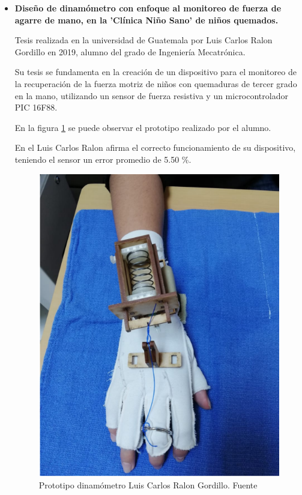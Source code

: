 \begin{itemize}
    Mayra Lasteña Millingalli Ortega et al, en su artículo de revisión llamado 'Uso del dinamómetro para mejorar la fuerza de la mano del adulto mayor' publicado en la Revista Científica Arbitrada Multidisciplinaria PENTACIENCIAS en Octubre de 2023, realizan un trabajo de investigación revisando artículos en inglés y español publicados entre 2013 y 2022.
    La población de estudio son pacientes geriátricos tratados en Terapia Ocupacional, las investigadoras exponen que actualmente en estas sesiones de terapia los pacientes son evaluados mediante métodos manuales como las escalas de registros, afirman que estos métodos son rudimentarios y no evidentes. \cite{Articulo_din}\footnote{Artículo que habla sobre el uso del dinamómetro\cite{Articulo_din}.}
    \item \textbf{Diseño de dinamómetro con enfoque al monitoreo de fuerza de agarre de mano, en la 'Clínica Niño Sano' de niños quemados.}

    Tesis realizada en la universidad de Guatemala por Luis Carlos Ralon Gordillo en 2019, alumno del grado de  Ingeniería Mecatrónica. 

    Su tesis se fundamenta en la creación de un dispositivo para el monitoreo de la recuperación de la fuerza motriz de niños con quemaduras de tercer grado en la mano, utilizando un sensor de fuerza resistiva y un  microcontrolador PIC 16F88.

    En la figura \ref{fig:Prototipo dinamómetro Luis} se puede observar el prototipo realizado por el alumno.

    En el Luis Carlos Ralon afirma el correcto funcionamiento de su dispositivo, teniendo el sensor un  error promedio de 5.50 \%.

    \begin{figure}
        \centering
        \includegraphics[width=0.5\linewidth]{img/TesisGuatemala.png}
        \caption{Prototipo dinamómetro Luis Carlos Ralon Gordillo. Fuente \cite{ralon_gordillo_diseno_2019} }
        \label{fig:Prototipo dinamómetro Luis}
    \end{figure}    
\end{itemize}